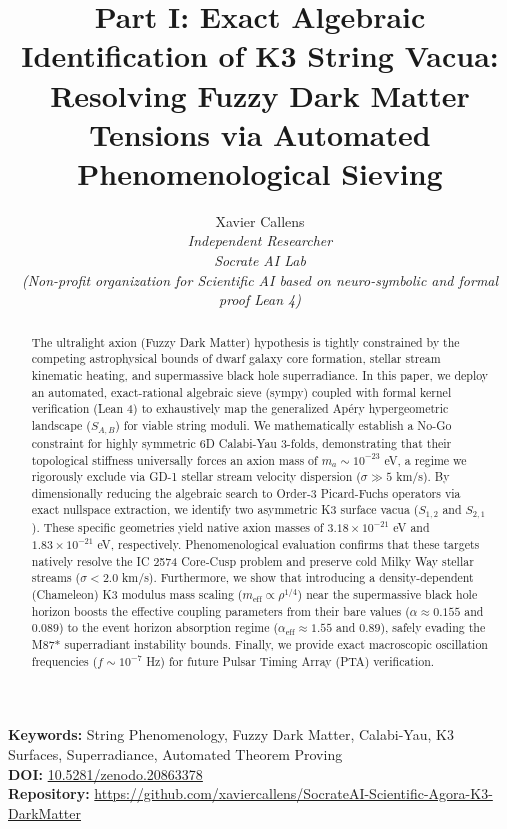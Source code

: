 \documentclass[11pt,a4paper]{article}
\title{Part I: Exact Algebraic Identification of K3 String Vacua: Resolving Fuzzy Dark Matter Tensions via Automated Phenomenological Sieving}
\author{Xavier Callens \\ \textit{Independent Researcher} \\ \textit{Socrate AI Lab} \\ \textit{(Non-profit organization for Scientific AI based on neuro-symbolic and formal proof Lean 4)}}
\date{}
\begin{document}
\maketitle

\begin{abstract}
The ultralight axion (Fuzzy Dark Matter) hypothesis is tightly constrained by the competing astrophysical bounds of dwarf galaxy core formation, stellar stream kinematic heating, and supermassive black hole superradiance. In this paper, we deploy an automated, exact-rational algebraic sieve (sympy) coupled with formal kernel verification (Lean 4) to exhaustively map the generalized Ap\'{e}ry hypergeometric landscape ($S_{A,B}$) for viable string moduli. We mathematically establish a No-Go constraint for highly symmetric 6D Calabi-Yau 3-folds, demonstrating that their topological stiffness universally forces an axion mass of $m_a \sim 10^{-23}$ eV, a regime we rigorously exclude via GD-1 stellar stream velocity dispersion ($\sigma \gg 5$ km/s). By dimensionally reducing the algebraic search to Order-3 Picard-Fuchs operators via exact nullspace extraction, we identify two asymmetric K3 surface vacua ($S_{1,2}$ and $S_{2,1}$). These specific geometries yield native axion masses of $3.18 \times 10^{-21}$ eV and $1.83 \times 10^{-21}$ eV, respectively. Phenomenological evaluation confirms that these targets natively resolve the IC 2574 Core-Cusp problem and preserve cold Milky Way stellar streams ($\sigma < 2.0$ km/s). Furthermore, we show that introducing a density-dependent (Chameleon) K3 modulus mass scaling ($m_{\text{eff}} \propto \rho^{1/4}$) near the supermassive black hole horizon boosts the effective coupling parameters from their bare values ($\alpha \approx 0.155$ and $0.089$) to the event horizon absorption regime ($\alpha_{\text{eff}} \approx 1.55$ and $0.89$), safely evading the M87* superradiant instability bounds. Finally, we provide exact macroscopic oscillation frequencies ($f \sim 10^{-7}$ Hz) for future Pulsar Timing Array (PTA) verification.
\end{abstract}

\vspace{1em}
\noindent\textbf{Keywords:} String Phenomenology, Fuzzy Dark Matter, Calabi-Yau, K3 Surfaces, Superradiance, Automated Theorem Proving\\
\textbf{DOI:} \href{https://doi.org/10.5281/zenodo.20863378}{10.5281/zenodo.20863378} \\
\textbf{Repository:} \url{https://github.com/xaviercallens/SocrateAI-Scientific-Agora-K3-DarkMatter}
\end{document}
